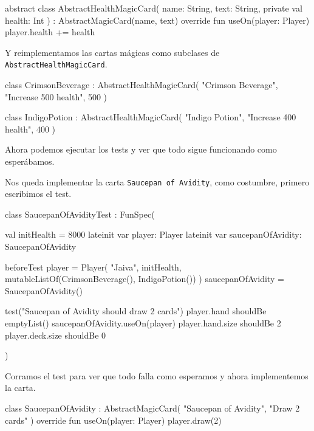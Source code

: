   \begin{kotlin}
    abstract class AbstractHealthMagicCard(
      name: String, text: String, private val health: Int
    ) : AbstractMagicCard(name, text) {
      override fun useOn(player: Player) {
        player.health += health
      }
    }
  \end{kotlin}

  Y reimplementamos las cartas mágicas como subclases de \texttt{AbstractHealthMagicCard}.

  \begin{kotlin}
    class CrimsonBeverage : AbstractHealthMagicCard(
      "Crimson Beverage",
      "Increase 500 health",
      500
    )
  \end{kotlin}

  \begin{kotlin}
    class IndigoPotion : AbstractHealthMagicCard(
      "Indigo Potion",
      "Increase 400 health",
      400
    )
  \end{kotlin}

  Ahora podemos ejecutar los tests y ver que todo sigue funcionando como esperábamos.

  Nos queda implementar la carta \texttt{Saucepan of Avidity}, como costumbre, primero
  escribimos el test.

  \begin{kotlin}
    class SaucepanOfAvidityTest : FunSpec({
      val initHealth = 8000
      lateinit var player: Player
      lateinit var saucepanOfAvidity: SaucepanOfAvidity

      beforeTest {
        player = Player(
          "Jaiva",
          initHealth,
          mutableListOf(CrimsonBeverage(), IndigoPotion())
        )
        saucepanOfAvidity = SaucepanOfAvidity()
      }

      test("Saucepan of Avidity should draw 2 cards") {
        player.hand shouldBe emptyList()
        saucepanOfAvidity.useOn(player)
        player.hand.size shouldBe 2
        player.deck.size shouldBe 0
      }
    })
  \end{kotlin}

  Corramos el test para ver que todo falla como esperamos y ahora implementemos la carta.

  \begin{kotlin}
    class SaucepanOfAvidity : AbstractMagicCard(
      "Saucepan of Avidity",
      "Draw 2 cards"
    ) {
      override fun useOn(player: Player) {
        player.draw(2)
      }
    }
  \end{kotlin}
  
